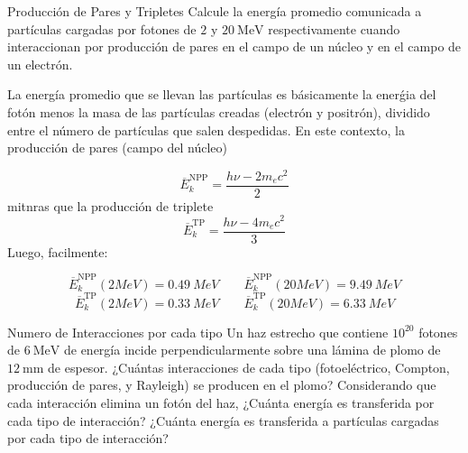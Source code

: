 
\begin{Ejercicio}{Producción de Pares y Tripletes}
    Calcule la energía promedio comunicada a partículas cargadas por fotones de $2$ y $20\ \text{MeV}$ respectivamente cuando interaccionan por producción de pares en el campo de un núcleo y en el campo de un electrón.
\end{Ejercicio}

La energía promedio que se llevan las partículas es básicamente la enerǵia del fotón menos la masa de las partículas creadas (electrón y positrón), dividido entre el número de partículas que salen despedidas. En este contexto, la producción de pares (campo del núcleo)

\begin{equation}
    \overline{E}_{k}^{\text{NPP}} = \frac{h \nu - 2 m_ec^2}{2} 
\end{equation}
mitnras que la producción de triplete
\begin{equation}
    \overline{E}_{k}^{\text{TP}}= \frac{h \nu - 4 m_ec^2}{3} 
\end{equation}
Luego, facilmente: 

\begin{equation}
    \overline{E}_{k}^{\text{NPP}} (2 \unit{MeV}) =0.49 \ \unit{MeV} \qquad 
    \overline{E}_{k}^{\text{NPP}} (20 \unit{MeV}) = 9.49 \ \unit{MeV}
\end{equation}
\begin{equation}
    \overline{E}_{k}^{\text{TP}} (2 \unit{MeV}) = 0.33 \ \unit{MeV} \qquad 
    \overline{E}_{k}^{\text{TP}} (20 \unit{MeV}) = 6.33 \ \unit{MeV}
\end{equation}


\begin{Ejercicio}{Numero de Interacciones por cada tipo}
    Un haz estrecho que contiene $10^{20}$ fotones de $6\ \text{MeV}$ de energía incide perpendicularmente sobre una lámina de plomo de $12\ \text{mm}$ de espesor. ¿Cuántas interacciones de cada tipo (fotoeléctrico, Compton, producción de pares, y Rayleigh) se producen en el plomo? Considerando que cada interacción elimina un fotón del haz, ¿Cuánta energía es transferida por cada tipo de interacción? ¿Cuánta energía es transferida a partículas cargadas por cada tipo de interacción?
\end{Ejercicio} 

